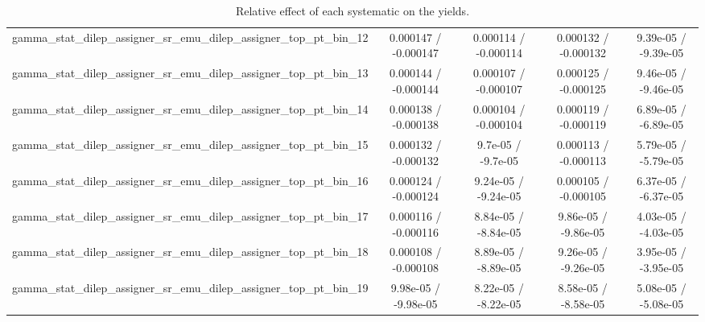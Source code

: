 \documentclass[10pt]{article}
\begin{document}
\begin{table}[htbp]
\begin{center}
\begin{tabular}{|c|c|c|c|c|}
  gamma_stat_dilep_assigner_sr_emu_dilep_assigner_top_pt_bin_12 & 0.000147 / -0.000147 & 0.000114 / -0.000114 & 0.000132 / -0.000132 & 9.39e-05 / -9.39e-05 \\ 
  gamma_stat_dilep_assigner_sr_emu_dilep_assigner_top_pt_bin_13 & 0.000144 / -0.000144 & 0.000107 / -0.000107 & 0.000125 / -0.000125 & 9.46e-05 / -9.46e-05 \\ 
  gamma_stat_dilep_assigner_sr_emu_dilep_assigner_top_pt_bin_14 & 0.000138 / -0.000138 & 0.000104 / -0.000104 & 0.000119 / -0.000119 & 6.89e-05 / -6.89e-05 \\ 
  gamma_stat_dilep_assigner_sr_emu_dilep_assigner_top_pt_bin_15 & 0.000132 / -0.000132 & 9.7e-05 / -9.7e-05 & 0.000113 / -0.000113 & 5.79e-05 / -5.79e-05 \\ 
  gamma_stat_dilep_assigner_sr_emu_dilep_assigner_top_pt_bin_16 & 0.000124 / -0.000124 & 9.24e-05 / -9.24e-05 & 0.000105 / -0.000105 & 6.37e-05 / -6.37e-05 \\ 
  gamma_stat_dilep_assigner_sr_emu_dilep_assigner_top_pt_bin_17 & 0.000116 / -0.000116 & 8.84e-05 / -8.84e-05 & 9.86e-05 / -9.86e-05 & 4.03e-05 / -4.03e-05 \\ 
  gamma_stat_dilep_assigner_sr_emu_dilep_assigner_top_pt_bin_18 & 0.000108 / -0.000108 & 8.89e-05 / -8.89e-05 & 9.26e-05 / -9.26e-05 & 3.95e-05 / -3.95e-05 \\ 
  gamma_stat_dilep_assigner_sr_emu_dilep_assigner_top_pt_bin_19 & 9.98e-05 / -9.98e-05 & 8.22e-05 / -8.22e-05 & 8.58e-05 / -8.58e-05 & 5.08e-05 / -5.08e-05 \\ 
\hline 
\end{tabular} 
\caption{Relative effect of each systematic on the yields.} 
\end{center} 
\end{table} 
\end{document}
